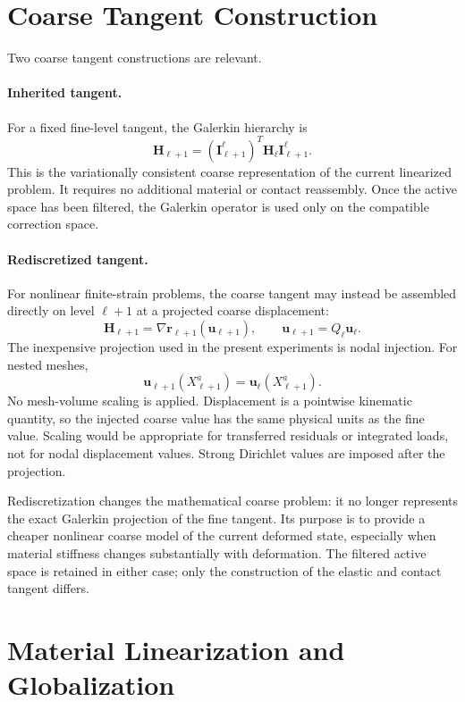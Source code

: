 \documentclass[11pt]{article}
\newcommand{\ud}{\boldsymbol{u}}
\newcommand{\rr}{\boldsymbol{r}}
\newcommand{\HH}{\boldsymbol{H}}
\newcommand{\II}{\boldsymbol{I}}
\begin{document}
\section{Coarse Tangent Construction}
\label{sec:coarse-tangents}

Two coarse tangent constructions are relevant.

\paragraph{Inherited tangent.}
For a fixed fine-level tangent, the Galerkin hierarchy is
\[
    \HH_{\ell+1}
    =
    (\II_{\ell+1}^{\ell})^T
    \HH_\ell
    \II_{\ell+1}^{\ell}.
\]
This is the variationally consistent coarse representation of the current
linearized problem.  It requires no additional material or contact
reassembly.  Once the active space has been filtered, the Galerkin operator is
used only on the compatible correction space.

\paragraph{Rediscretized tangent.}
For nonlinear finite-strain problems, the coarse tangent may instead be
assembled directly on level $\ell+1$ at a projected coarse displacement:
\[
    \HH_{\ell+1}
    =
    \nabla\rr_{\ell+1}(\ud_{\ell+1}),
    \qquad
    \ud_{\ell+1}=Q_\ell\ud_\ell .
\]
The inexpensive projection used in the present experiments is nodal
injection.  For nested meshes,
\[
    \ud_{\ell+1}(X_{\ell+1}^a)
    =
    \ud_\ell(X_{\ell+1}^a).
\]
No mesh-volume scaling is applied.  Displacement is a pointwise kinematic
quantity, so the injected coarse value has the same physical units as the
fine value.  Scaling would be appropriate for transferred residuals or
integrated loads, not for nodal displacement values.  Strong Dirichlet values
are imposed after the projection.

Rediscretization changes the mathematical coarse problem: it no longer
represents the exact Galerkin projection of the fine tangent.  Its purpose is
to provide a cheaper nonlinear coarse model of the current deformed state,
especially when material stiffness changes substantially with deformation.
The filtered active space is retained in either case; only the construction
of the elastic and contact tangent differs.

\section{Material Linearization and Globalization}
\label{sec:globalization}
\end{document}
